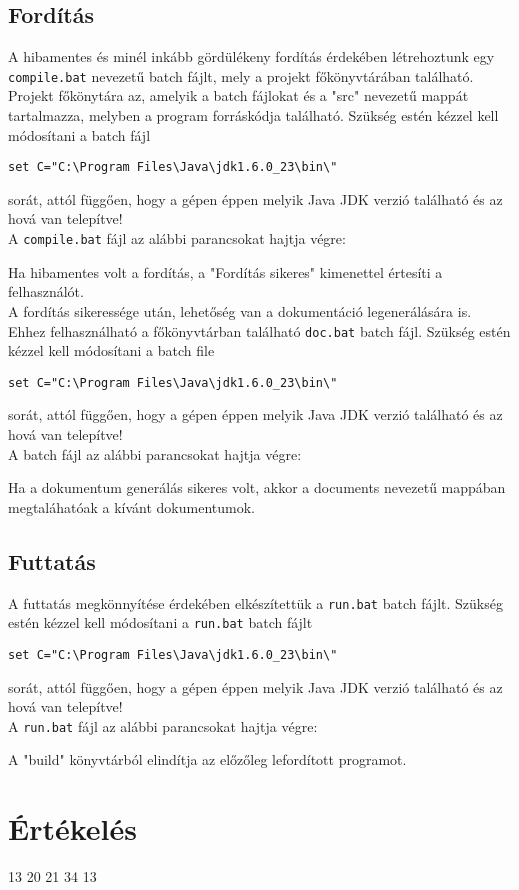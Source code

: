 \subsection{Fordítás}
A hibamentes és minél inkább gördülékeny fordítás érdekében létrehoztunk egy \texttt{compile.bat} nevezetű batch fájlt, mely a projekt főkönyvtárában található. Projekt főkönytára az, amelyik a batch fájlokat és a "src" nevezetű mappát tartalmazza, melyben a program forráskódja található. Szükség estén kézzel kell módosítani a batch fájl
\begin{verbatim}
set C="C:\Program Files\Java\jdk1.6.0_23\bin\"
\end{verbatim}
sorát, attól függően, hogy a gépen éppen melyik Java JDK verzió található és az hová van telepítve!\\
A \texttt{compile.bat} fájl az alábbi parancsokat hajtja végre:

Ha hibamentes volt a fordítás, a "Fordítás sikeres" kimenettel értesíti a felhasználót.\\
A fordítás sikeressége után, lehetőség van a dokumentáció legenerálására is. Ehhez felhasználható a főkönyvtárban található \texttt{doc.bat} batch fájl.
Szükség estén kézzel kell módosítani a batch file \begin{verbatim}
set C="C:\Program Files\Java\jdk1.6.0_23\bin\"
\end{verbatim}
sorát, attól függően, hogy a gépen éppen melyik Java JDK verzió található és az hová van telepítve!\\
A batch fájl az alábbi parancsokat hajtja végre:

Ha a dokumentum generálás sikeres volt, akkor a documents nevezetű mappában megtaláhatóak a kívánt dokumentumok.
\subsection{Futtatás}
A futtatás megkönnyítése érdekében elkészítettük a \texttt{run.bat} batch fájlt.
Szükség estén kézzel kell módosítani a \texttt{run.bat} batch fájlt
\begin{verbatim}
set C="C:\Program Files\Java\jdk1.6.0_23\bin\"
\end{verbatim} sorát, attól függően, hogy a gépen éppen melyik Java JDK verzió található és az hová van telepítve!\\
A \texttt{run.bat} fájl az alábbi parancsokat hajtja végre:

A "build" könyvtárból elindítja az előzőleg lefordított programot.

\section{Értékelés}

\begin{ertekeles}
{13}
{20}
{21}
{34}
{13}
\end{ertekeles}
